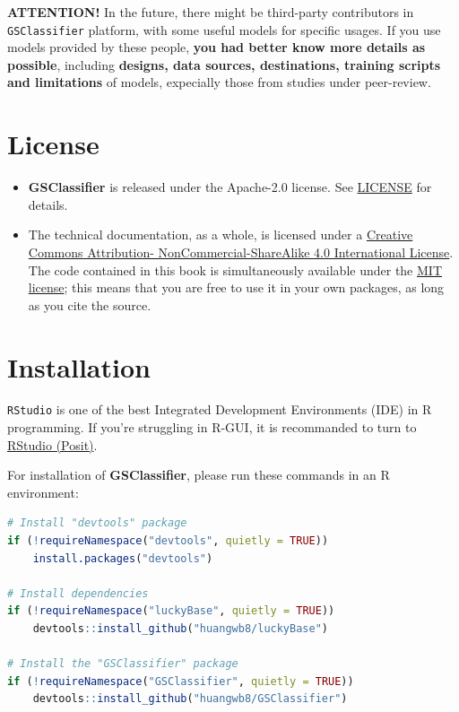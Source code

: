 \documentclass[
  12pt,
]{book}
\newcommand{\passthrough}[1]{#1}
\begin{document}
\textbf{ATTENTION!} In the future, there might be third-party contributors in \passthrough{\lstinline!GSClassifier!} platform, with some useful models for specific usages. If you use models provided by these people, \textbf{you had better know more details as possible}, including \textbf{designs, data sources, destinations, training scripts and limitations} of models, expecially those from studies under peer-review.

\hypertarget{license}{%
\section*{License}\label{license}}

\begin{itemize}
\item
  \textbf{GSClassifier} is released under the Apache-2.0 license. See \href{https://github.com/huangwb8/GSClassifier/blob/master/license.txt}{LICENSE} for details.
\item
  The technical documentation, as a whole, is licensed under a \href{http://creativecommons.org/licenses/by-nc-sa/4.0/}{Creative Commons Attribution-
  NonCommercial-ShareAlike 4.0 International License}. The code contained in this book is simultaneously available under the \href{https://opensource.org/licenses/MIT}{MIT license}; this means that you are free to use it in your own packages, as long as you cite the source.
\end{itemize}

\hypertarget{installation}{%
\section*{Installation}\label{installation}}

\passthrough{\lstinline!RStudio!} is one of the best Integrated Development Environments (IDE) in R programming. If you're struggling in R-GUI, it is recommanded to turn to \href{https://www.rstudio.com/}{RStudio (Posit)}.

For installation of \textbf{GSClassifier}, please run these commands in an R environment:

\begin{lstlisting}[language=R]
# Install "devtools" package
if (!requireNamespace("devtools", quietly = TRUE))
    install.packages("devtools")

# Install dependencies
if (!requireNamespace("luckyBase", quietly = TRUE))
    devtools::install_github("huangwb8/luckyBase")

# Install the "GSClassifier" package
if (!requireNamespace("GSClassifier", quietly = TRUE))
    devtools::install_github("huangwb8/GSClassifier")
\end{lstlisting}
\end{document}
